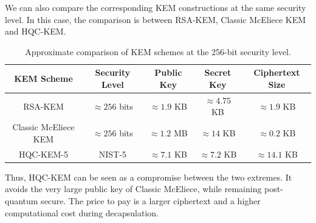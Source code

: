 \bigskip

\noindent
We can also compare the corresponding KEM constructions at the same security 
level. In this case, the comparison is between RSA-KEM, Classic McEliece KEM and 
HQC-KEM.

\begin{table}[H]
\centering
\small
\renewcommand{\arraystretch}{1.35}
\begin{tabular}{|c|c|c|c|c|}
\hline
\rowcolor{gray!20}
\textbf{KEM Scheme} & \textbf{Security Level} & \textbf{Public Key} & \textbf{Secret Key} & \textbf{Ciphertext Size} \\
\hline

RSA-KEM & \(\approx 256\) bits & \(\approx 1.9\) KB & \(\approx 4.75\) KB & \(\approx 1.9\) KB \\
\hline

Classic McEliece KEM & \(\approx 256\) bits & \(\approx 1.2\) MB & \(\approx 14\) KB & \(\approx 0.2\) KB \\
\hline

HQC-KEM-5 & NIST-5 & \(\approx 7.1\) KB & \(\approx 7.2\) KB & \(\approx 14.1\) KB \\
\hline

\end{tabular}
\caption{Approximate comparison of KEM schemes at the 256-bit security level.}
\label{tab:kem_comparison_256}
\end{table}

\medskip

\noindent
Thus, HQC-KEM can be seen as a compromise between the two extremes. It avoids 
the very large public key of Classic McEliece, while remaining post-quantum 
secure. The price to pay is a larger ciphertext and a higher computational cost 
during decapsulation.
